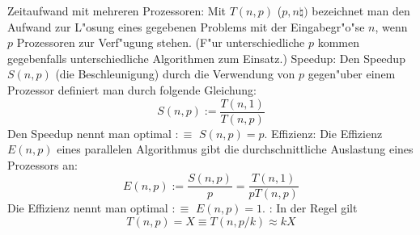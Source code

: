  Zeitaufwand mit mehreren Prozessoren:{
  Mit $T(n,p)$ ($p,n\natural)$ bezeichnet man den Aufwand zur L"osung eines 
  gegebenen Problems mit der Eingabegr"o"se $n$, wenn $p$ Prozessoren zur
  Verf"ugung stehen. (F"ur unterschiedliche $p$ kommen gegebenfalls 
  unterschiedliche Algorithmen zum Einsatz.)
}
 Speedup:{
  Den Speedup $S(n,p)$ (die Beschleunigung) durch die Verwendung von $p$
  gegen"uber einem Prozessor definiert man durch folgende Gleichung:
  \[
    S(n,p):=\frac{T(n,1)}{T(n,p)}
  \]
  Den Speedup nennt man optimal  $:\equiv$ $S(n,p)=p$.
}
 Effizienz:{
  Die Effizienz $E(n,p)$ eines parallelen Algorithmus gibt die durchschnittliche
  Auslastung eines Prozessors an:
  \[
    E(n,p):=\frac {S(n,p)} p = \frac{T(n,1)}{pT(n,p)}
  \]
  Die Effizienz nennt man optimal  $:\equiv$ $E(n,p)=1$.
}
\remark:{
  In der Regel gilt
  \[
    T(n,p)=X \equiv T(n,p/k)\approx k X
  \]
}
